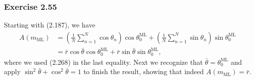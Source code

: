 \documentclass[12pt, a4paper]{article}
\begin{document}
\subsubsection*{Exercise 2.55}
Starting with (2.187), we have
\begin{align*}
	A(m_{\text{ML}})
	&=
	\left( \frac{1}{N} \sum_{n=1}^N \cos \theta_n \right) \cos \theta_0^{\text{ML}}
	+
	\left( \frac{1}{N} \sum_{n=1}^N \sin \theta_n \right) \sin \theta_0^{\text{ML}}\\
	&= 
	\bar{r} \cos \bar{\theta} \cos \theta_0^{\text{ML}}
	+
	\bar{r} \sin \bar{\theta} \sin \theta_0^{\text{ML}},
\end{align*}
where we used (2.268) in the last equality.
Next we recognize that $\bar{\theta} = \theta_0^{\text{ML}}$ and apply $\sin^2 \bar{\theta} + \cos^2 \bar{\theta} = 1$ to finish the result, showing that indeed $A(m_{\text{ML}}) = \bar{r}$.
\end{document}

